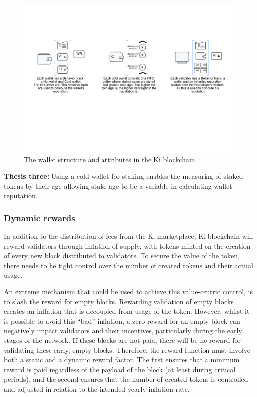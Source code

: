 \begin{figure}
	\includegraphics[width=\linewidth, trim= 1cm 8cm 1cm 5cm, clip]{Figures/wallets.pdf}
	\caption{The wallet structure and attributes in the Ki blockchain.}
	\label{fig:wallets}
\end{figure}

\textbf{Thesis three:} Using a cold wallet for staking enables the measuring of staked tokens by their age allowing stake age to be a variable in calculating wallet reputation.

\subsubsection{Dynamic rewards}
\label{sec:kiblockchainreward}
In addition to the distribution of fees from the Ki marketplace,  Ki blockchain will reward validators through inflation of supply, with tokens minted on the creation of every new block distributed to validators. To secure the value of the token, there needs to be tight control over the number of created tokens and their actual usage.

An extreme mechanism that could be used to achieve this value-centric control, is to slash the reward for empty blocks. Rewarding validation of empty blocks creates an inflation that is decoupled from usage of the token. However, whilst it is possible to avoid this “bad” inflation, a zero reward for an empty block can negatively impact validators and their incentives, particularly during the early stages of the network. If these blocks are not paid, there will be no reward for validating these early, empty blocks. Therefore, the reward function must involve both a static and a dynamic reward factor. The first ensures that a minimum reward is paid regardless of the payload of the block (at least during critical periods), and the second ensures that the number of created tokens is controlled and adjusted in relation to the intended yearly inflation rate. 

